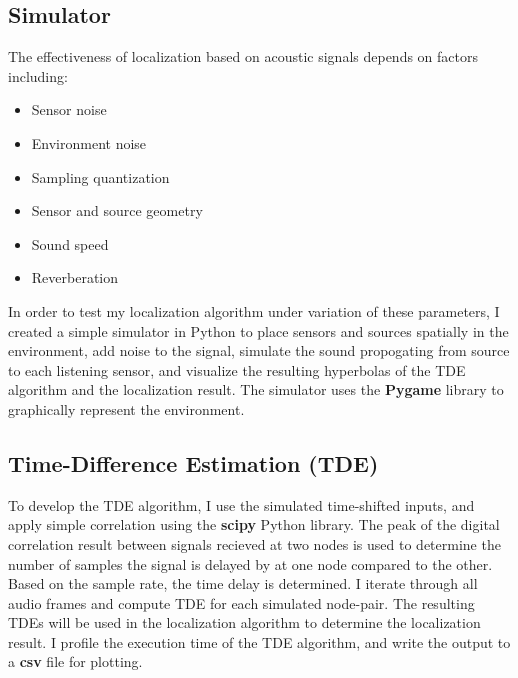 \documentclass[12pt]{article}
\begin{document}
\subsection{Simulator}
	The effectiveness of localization based on acoustic signals depends on factors including:
	
\begin{itemize}
  \item Sensor noise
  \item Environment noise
  \item Sampling quantization
  \item Sensor and source geometry
  \item Sound speed
  \item Reverberation
\end{itemize}

	In order to test my localization algorithm under variation of these parameters, I created a simple simulator in Python to place sensors and sources spatially in the environment, add noise to the signal, simulate the sound propogating from source to each listening sensor, and visualize the resulting hyperbolas of the TDE algorithm and the localization result. The simulator uses the \textbf{Pygame} library to graphically represent the environment.
	

\subsection{Time-Difference Estimation (TDE)}
	To develop the TDE algorithm, I use the simulated time-shifted inputs, and apply simple correlation using the \textbf{scipy} Python library. The peak of the digital correlation result between signals recieved at two nodes is used to determine the number of samples the signal is delayed by at one node compared to the other. Based on the sample rate, the time delay is determined.
	I iterate through all audio frames and compute TDE for each simulated node-pair. The resulting TDEs will be used in the localization algorithm to determine the localization result. I profile the execution time of the TDE algorithm, and write the output to a \textbf{csv} file for plotting.
	
\end{document}
